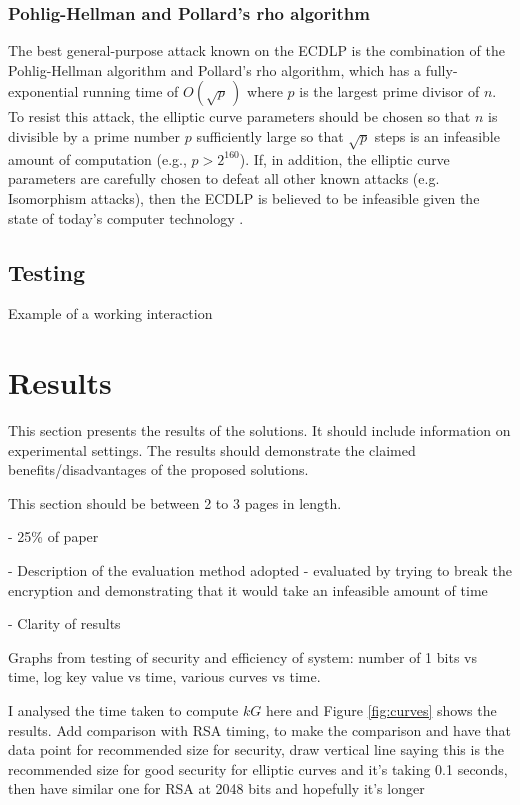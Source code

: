 \documentclass[12pt,a4paper]{article}
\begin{document}
\subsubsection{Pohlig-Hellman and Pollard's rho algorithm}\noindent \label{Pohlig-Hellman and Pollard's rho algorithm}
The best general-purpose attack known on the ECDLP is the combination of the Pohlig-Hellman algorithm and Pollard's rho algorithm, 
which has a fully-exponential running time of $O( \sqrt p \,)$ where $p$ is the largest prime divisor of $n$. 
To resist this attack, the elliptic curve parameters should be chosen so that $n$ is divisible by a prime number $p$ sufficiently large 
so that $\sqrt p$ steps is an infeasible amount of computation (e.g., $p > 2^{160}$).
If, in addition, the elliptic curve parameters are carefully chosen to defeat all other known attacks (e.g. Isomorphism attacks), 
then the ECDLP is believed to be infeasible given the state of today's computer technology \cite{hankerson2003guide}.

\subsection{Testing}\noindent \label{Testing}
Example of a working interaction


\section{Results}\noindent \label{Results}
This section presents the results of the solutions. 
It should include information on experimental settings. 
The results should demonstrate the claimed benefits/disadvantages of the proposed solutions.

This section should be between 2 to 3 pages in length.

- 25\% of paper

- Description of the evaluation method adopted - evaluated by trying to break the encryption and demonstrating that it would take an infeasible amount of time

- Clarity of results


Graphs from testing of security and efficiency of system: number of 1 bits vs time, log key value vs time, various curves vs time.

I analysed the time taken to compute $kG$ here and Figure \ref{fig:curves} shows the results. 
Add comparison with RSA timing, to make the comparison and have that data point for recommended size for security, 
draw vertical line saying this is the recommended size for good security for elliptic curves and it's taking 0.1 seconds, 
then have similar one for RSA at 2048 bits and hopefully it's longer
\end{document}
